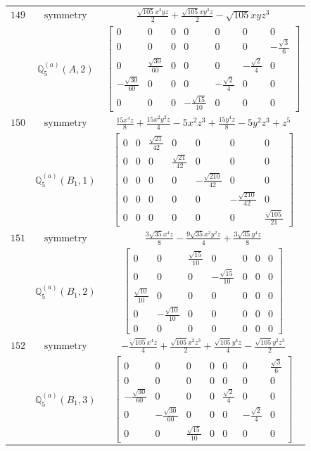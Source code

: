 \documentclass[fleqn,8pt,landscape]{jsarticle}
\begin{document}
\begin{longtable}{ccc}
$ 149 $ & $ \text{symmetry} $ & $ \frac{\sqrt{105} x^{3} y z}{2} + \frac{\sqrt{105} x y^{3} z}{2} - \sqrt{105} x y z^{3} $ \\
$  $ & $ \mathbb{Q}_{5}^{(a)}(A,2) $ & $ \begin{bmatrix} 0 & 0 & 0 & 0 & 0 & 0 & 0 \\ 0 & 0 & 0 & 0 & 0 & 0 & - \frac{\sqrt{3}}{6} \\ 0 & \frac{\sqrt{30}}{60} & 0 & 0 & 0 & - \frac{\sqrt{2}}{4} & 0 \\ - \frac{\sqrt{30}}{60} & 0 & 0 & 0 & - \frac{\sqrt{2}}{4} & 0 & 0 \\ 0 & 0 & 0 & - \frac{\sqrt{15}}{10} & 0 & 0 & 0 \end{bmatrix} $ \\ \hline
$ 150 $ & $ \text{symmetry} $ & $ \frac{15 x^{4} z}{8} + \frac{15 x^{2} y^{2} z}{4} - 5 x^{2} z^{3} + \frac{15 y^{4} z}{8} - 5 y^{2} z^{3} + z^{5} $ \\
$  $ & $ \mathbb{Q}_{5}^{(a)}(B_{1},1) $ & $ \begin{bmatrix} 0 & 0 & \frac{\sqrt{21}}{42} & 0 & 0 & 0 & 0 \\ 0 & 0 & 0 & \frac{\sqrt{21}}{42} & 0 & 0 & 0 \\ 0 & 0 & 0 & 0 & - \frac{\sqrt{210}}{42} & 0 & 0 \\ 0 & 0 & 0 & 0 & 0 & - \frac{\sqrt{210}}{42} & 0 \\ 0 & 0 & 0 & 0 & 0 & 0 & \frac{\sqrt{105}}{21} \end{bmatrix} $ \\ \hline
$ 151 $ & $ \text{symmetry} $ & $ \frac{3 \sqrt{35} x^{4} z}{8} - \frac{9 \sqrt{35} x^{2} y^{2} z}{4} + \frac{3 \sqrt{35} y^{4} z}{8} $ \\
$  $ & $ \mathbb{Q}_{5}^{(a)}(B_{1},2) $ & $ \begin{bmatrix} 0 & 0 & \frac{\sqrt{15}}{10} & 0 & 0 & 0 & 0 \\ 0 & 0 & 0 & - \frac{\sqrt{15}}{10} & 0 & 0 & 0 \\ \frac{\sqrt{10}}{10} & 0 & 0 & 0 & 0 & 0 & 0 \\ 0 & - \frac{\sqrt{10}}{10} & 0 & 0 & 0 & 0 & 0 \\ 0 & 0 & 0 & 0 & 0 & 0 & 0 \end{bmatrix} $ \\ \hline
$ 152 $ & $ \text{symmetry} $ & $ - \frac{\sqrt{105} x^{4} z}{4} + \frac{\sqrt{105} x^{2} z^{3}}{2} + \frac{\sqrt{105} y^{4} z}{4} - \frac{\sqrt{105} y^{2} z^{3}}{2} $ \\
$  $ & $ \mathbb{Q}_{5}^{(a)}(B_{1},3) $ & $ \begin{bmatrix} 0 & 0 & 0 & 0 & 0 & 0 & \frac{\sqrt{3}}{6} \\ 0 & 0 & 0 & 0 & 0 & 0 & 0 \\ - \frac{\sqrt{30}}{60} & 0 & 0 & 0 & \frac{\sqrt{2}}{4} & 0 & 0 \\ 0 & - \frac{\sqrt{30}}{60} & 0 & 0 & 0 & - \frac{\sqrt{2}}{4} & 0 \\ 0 & 0 & \frac{\sqrt{15}}{10} & 0 & 0 & 0 & 0 \end{bmatrix} $ \\ \hline

\end{longtable}
\end{document}
